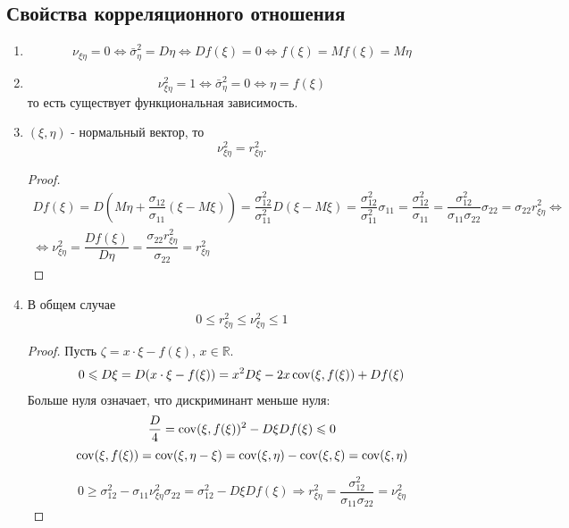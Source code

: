 \subsection{Свойства корреляционного отношения}
\begin{enumerate}
  \item 
    \[
      \nu_{\xi\eta} = 0 \Leftrightarrow \bar\sigma^2_\eta = D\eta \Leftrightarrow Df(\xi) = 0 \Leftrightarrow f(\xi) = Mf(\xi) = M\eta
    \]
  \item
    \[
    \nu_{\xi\eta}^2 = 1 \Leftrightarrow \bar\sigma_\eta^2 = 0 \Leftrightarrow \eta = f(\xi)
    \]
    то есть существует функциональная зависимость.

  \item $(\xi, \eta)$ - нормальный вектор, то 
    \[
      \nu_{\xi\eta}^2 = r_{\xi\eta}^2.
    \]
    \begin{proof}
      \begin{multline*}
        Df(\xi) = D(M\eta + \dfrac{\sigma_{12}}{\sigma_{11}} (\xi - M\xi))
        = \dfrac{\sigma_{12}^2}{\sigma_{11}^2} D(\xi - M\xi)
        = \dfrac{\sigma_{12}^2}{\sigma_{11}^2} \sigma_{11}
        = \dfrac{\sigma_{12}^2}{\sigma_{11}}
        = \dfrac{\sigma_{12}^2}{\sigma_{11} \sigma_{22}} \sigma_{22}
        = \sigma_{22} r_{\xi\eta}^2
        \Leftrightarrow \\
        \Leftrightarrow
        \nu_{\xi\eta}^2 = \dfrac{Df(\xi)}{D\eta} = \dfrac{\sigma_{22} r_{\xi\eta}^2}{\sigma_{22}} = r_{\xi\eta}^2
      \end{multline*}
    \end{proof}

  \item В общем случае
    \[
      0 \leqslant r_{\xi\eta}^2 \leqslant \nu_{\xi\eta}^2 \leqslant 1
    \]
    \begin{proof}
      Пусть $\zeta = x \cdot \xi - f(\xi)$, $x\in\mathbb{R}$.
      \begin{multline*}
        0 \leqslant D\xi = D(x \cdot \xi - f(\xi)) = x^2 D\xi - 2 x \operatorname{cov} (\xi, f(\xi)) + D f(\xi)
      \end{multline*}
      Больше нуля означает, что дискриминант меньше нуля:
      \[
        \dfrac{D}{4} = \operatorname{cov}(\xi, f(\xi))^2 - D\xi Df(\xi) \leqslant 0
      \]
      \[
        \operatorname{cov}(\xi, f(\xi)) = \operatorname{cov}(\xi, \eta - \xi)
        = \operatorname{cov}(\xi, \eta) - \operatorname{cov}(\xi, \xi) = \operatorname{cov}(\xi, \eta)
      \]

      \[
        0 \geqslant \sigma_{12}^2 - \sigma_{11} \nu_{\xi\eta}^2 \sigma_{22} = \sigma_{12}^2 - D\xi Df(\xi) \Rightarrow r_{\xi\eta}^2 = \dfrac{\sigma_{12}^2}{\sigma_{11} \sigma_{22}} = \nu_{\xi\eta}^2
      \]
    \end{proof}
\end{enumerate}

